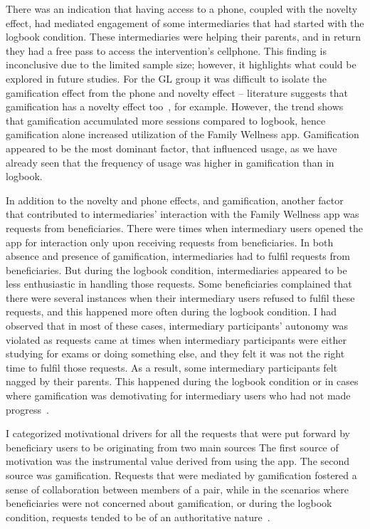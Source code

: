 There was an indication that having access to a phone, coupled with the novelty effect, had mediated engagement of some intermediaries that had started with the logbook condition. These intermediaries were helping their parents, and in return they had a free pass to access the intervention's cellphone. This finding is inconclusive due to the limited sample size; however, it highlights what could be explored in future studies. For the GL group it was difficult to isolate the gamification effect from the phone and novelty effect -- literature suggests that gamification has a novelty effect too~\citep{koivisto2014demographic}, for example. However, the trend shows that gamification accumulated more sessions compared to logbook, hence gamification alone increased utilization of the Family Wellness app. Gamification appeared to be the most dominant factor, that influenced usage, as we have already seen that the frequency of usage was higher in gamification than in logbook.

In addition to the novelty and phone effects, and gamification, another factor that contributed to intermediaries' interaction with the Family Wellness app was requests from beneficiaries. There were times when intermediary users opened the app for interaction only upon receiving requests from beneficiaries. In both absence and presence of gamification, intermediaries had to fulfil requests from beneficiaries.  But during the logbook condition, intermediaries appeared to be less enthusiastic in handling those requests. Some beneficiaries complained that there were several instances when their intermediary users refused to fulfil these requests, and this happened more often during the logbook condition. I had observed that in most of these cases, intermediary participants' autonomy was violated as requests came at times when intermediary participants were either studying for exams or doing something else, and they felt it was not the right time to fulfil those requests. As a result, some intermediary participants felt nagged by their parents. This happened during the logbook condition or in cases where gamification was demotivating for intermediary users who had not made progress~\citep{katule2016family}.

I categorized motivational drivers for all the requests that were put forward by beneficiary users to be originating from two main sources The first source of motivation was the instrumental value derived from using the app. The second source was gamification. Requests that were mediated by gamification fostered a sense of collaboration between members of a pair, while in the scenarios where beneficiaries were not concerned about gamification, or during the logbook condition, requests tended to be of an authoritative nature~\citep{katule2016family}. %

